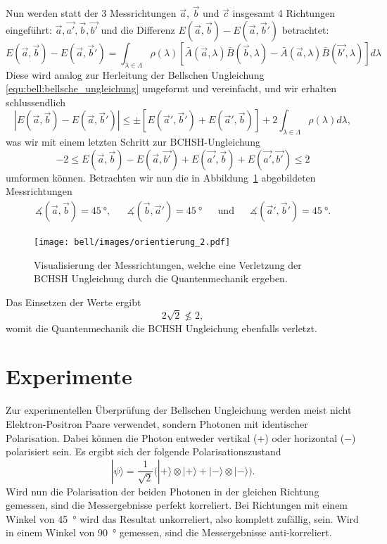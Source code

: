 \begin{refsection}
Nun werden statt der 3 Messrichtungen $\vec{a}$, $\vec{b}$ und $\vec{c}$
insgesamt 4 Richtungen eingef\"uhrt: $\vec{a}, \vec{a'}, \vec{b}, \vec{b'}$
und die Differenz $E(\vec{a},\vec{b}) - E(\vec{a},\vec{b}')$ betrachtet:
\begin{equation}
    E(\vec{a},\vec{b}) - E(\vec{a},\vec{b}') = 
    \int_{\lambda\in\Lambda} \rho(\lambda) \left[
        \bar{A}(\vec{a},\lambda)\bar{B}(\vec{b},\lambda) -
        \bar{A}(\vec{a},\lambda)\bar{B}(\vec{b'},\lambda)
    \right] d\lambda
\end{equation}
Diese wird analog zur Herleitung der Bellschen Ungleichung 
\eqref{equ:bell:bellsche_ungleichung} umgeformt und vereinfacht, und wir
erhalten schlussendlich
\[
    \left| E(\vec{a},\vec{b}) - E(\vec{a},\vec{b}') \right| \leq \pm \left[
        E(\vec{a}',\vec{b}') + E(\vec{a}',\vec{b})
    \right]
    + 2 \int_{\lambda\in\Lambda} \rho(\lambda) d\lambda,
\]
was wir mit einem letzten Schritt zur BCHSH-Ungleichung
\begin{equation}\label{equ:bell:bchsh-ungleichung}
    -2 \leq 
    E(\vec{a},\vec{b}) - E(\vec{a},\vec{b'}) + E(\vec{a'},\vec{b}) + E(\vec{a'},\vec{b'})
    \leq 2
\end{equation}
umformen k\"onnen.
Betrachten wir nun die in Abbildung~\ref{fig:bell:orientierung_2}
abgebildeten Messrichtungen
\begin{align*}
    \measuredangle(\vec{a},\vec{b}) = \SI{45}{\degree}, && 
    \measuredangle(\vec{b},\vec{a}') = \SI{45}{\degree} && 
    \text{und} &&
    \measuredangle(\vec{a}',\vec{b}') = \SI{45}{\degree}.
\end{align*}
\begin{figure}
    \centering
    \texttt{[image: bell/images/orientierung\_2.pdf]}
    \caption{Visualisierung der Messrichtungen, welche eine Verletzung der
    BCHSH Ungleichung durch die Quantenmechanik ergeben.}
    \label{fig:bell:orientierung_2}
\end{figure}
Das Einsetzen der Werte ergibt
\[
    2 \sqrt{2} \nleqslant 2,
\]
womit die Quantenmechanik die BCHSH Ungleichung ebenfalls verletzt.

\section{Experimente}
Zur experimentellen \"Uberpr\"ufung der Bellschen Ungleichung werden meist
nicht Elektron-Positron Paare verwendet, sondern
Photonen mit identischer Polarisation.
Dabei k\"onnen die Photon entweder vertikal ($+$) oder horizontal
($-$) polarisiert sein. 
Es ergibt sich der folgende Polarisationszustand
\begin{equation}\label{equ:bell:photonstate}
    |\psi\rangle = \frac{1}{\sqrt{2}} \Big(
        |{+}\rangle \otimes |{+}\rangle + |{-}\rangle \otimes |{-}\rangle
    \Big).
\end{equation}
Wird nun die Polarisation der beiden Photonen in der gleichen Richtung 
gemessen, sind die Messergebnisse perfekt korreliert.
Bei Richtungen mit einem Winkel von \SI{45}{\degree} wird das Resultat
unkorreliert, also komplett zuf\"allig, sein.
Wird in einem Winkel von \SI{90}{\degree} gemessen, sind die Messergebnisse
anti-korreliert.


\end{refsection}
